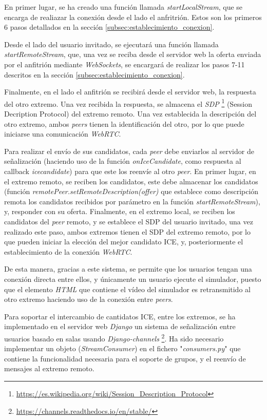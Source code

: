 \documentclass[a4paper, 12pt]{book}
\begin{document}
En primer lugar, se ha creado una función llamada \emph{startLocalStream}, que se encarga de realiazar la conexión desde el lado el anfritrión. Estos son los primeros 6 pasos detallados en la sección \ref{subsec:establecimiento_conexion}.

Desde el lado del usuario invitado, se ejecutará una función llamada \emph{startRemoteStream}, que, una vez se reciba desde el servidor web la oferta enviada por el anfitrión mediante \emph{WebSockets}, se encargará de realizar los pasos 7-11 descritos en la sección \ref{subsec:establecimiento_conexion}.

Finalmente, en el lado el anfitrión se recibirá desde el servidor web, la respuesta del otro extremo. Una vez recibida la respuesta, se almacena el \emph{SDP} \footnote{\url{https://es.wikipedia.org/wiki/Session_Description_Protocol}} (Session Decription Protocol) del extremo remoto. Una vez establecida la descripción del otro extremo, ambos \emph{peers} tienen la identificación del otro, por lo que puede iniciarse una comunicación \emph{WebRTC}.

Para realizar el envío de sus candidatos, cada \emph{peer} debe enviarlos al servidor de señalización (haciendo uso de la función \emph{onIceCandidate}, como respuesta al callback \emph{icecandidate}) para que este los reenvíe al otro \emph{peer}. En primer lugar, en el extremo remoto, se reciben los candidatos, este debe almacenar los candidatos (función \emph{remotePeer.setRemoteDescription(offer)} que establece como descripción remota los candidatos recibidos por parámetro en la función \emph{startRemoteStream}), y, responder con su oferta. Finalmente, en el extremo local, se reciben los candidatos del \emph{peer} remoto, y se establece el SDP del usuario invitado, una vez realizado este paso, ambos extremos tienen el SDP del extremo remoto, por lo que pueden iniciar la elección del mejor candidato ICE, y, posteriormente el establecimiento de la conexión \emph{WebRTC}.

De esta manera, gracias a este sistema, se permite que los usuarios tengan una conexión directa entre ellos, y únicamente un usuario ejecute el simulador, puesto que el elemento \emph{HTML} que contiene el vídeo del simulador es retransmitido al otro extremo haciendo uso de la conexión entre \emph{peers}.

Para soportar el intercambio de cantidatos ICE, entre los extremos, se ha implementado en el servidor web \emph{Django} un sistema de señalización entre usuarios basado en salas usando \emph{Django-channels} \footnote{\url{https://channels.readthedocs.io/en/stable/}}. Ha sido necesario implementar un objeto (\emph{StreamConsumer}) en el fichero "\emph{consumers.py}" que contiene la funcionalidad necesaria para el soporte de grupos, y el reenvío de mensajes al extremo remoto.
\end{document}
